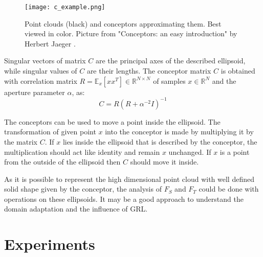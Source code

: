 \documentclass[shortabstract, inz, english]{iithesis}
\begin{document}
\begin{figure}%
    \centering
    \texttt{[image: c\_example.png]}%
    \caption{Point clouds (black) and conceptors approximating them. Best viewed in color. Picture from "Conceptors: an easy introduction" by Herbert Jaeger \cite{conc_int}. }
    \label{fig:conceptor_intro}%
\end{figure}
Singular vectors of matrix $C$ are the principal axes of the described ellipsoid, while singular values of $C$ are their lengths. The conceptor matrix $C$ is obtained with correlation matrix $R = \mathbb{E}_{x}[xx^{T}] \in \mathbb{R}^{N\times N}$ of samples $x \in \mathbb{R}^{N}$ and the aperture parameter $\alpha$, as:
\begin{equation*}
    C = R(R + \alpha^{-2} I)^{-1}
\end{equation*}
\par
The conceptors can be used to move a point inside the ellipsoid. The transformation of given point $x$ into the conceptor is made by multiplying it by the matrix $C$. If $x$ lies inside the ellipsoid that is described by the conceptor, the multiplication should act like identity and remain $x$ unchanged. If $x$ is a point from the outside of the ellipsoid then $C$ should move it inside.
\par
As it is possible to represent the high dimensional point cloud with well defined solid shape given by the conceptor, the analysis of $F_{S}$ and $F_{T}$ could be done with operations on these ellipsoids. It may be a good approach to understand the domain adaptation and the influence of GRL.

\chapter{Experiments}
\end{document}
